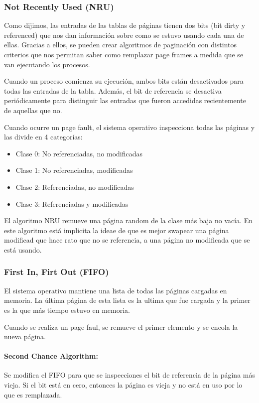 \subsubsection{Not Recently Used (NRU)}
Como dijimos, las entradas de las tablas de páginas tienen dos bits (bit dirty y referenced) que nos dan información sobre como se estuvo usando cada una de ellas. Gracias a ellos, se pueden crear algoritmos de paginación con distintos criterios que nos permitan saber como remplazar page frames a medida que se van ejecutando los procesos.

Cuando un proceso comienza su ejecución, ambos bits están desactivados para todas las entradas de la tabla. Además, el bit de referencia se desactiva periódicamente para distinguir las entradas que fueron accedidas recientemente de aquellas que no.

Cuando ocurre un page fault, el sistema operativo inspecciona todas las páginas y las divide en 4 categorías:

\begin{itemize}
	\item Clase 0: No referenciadas, no modificadas
	\item Clase 1: No referenciadas, modificadas
	\item Clase 2: Referenciadas, no modificadas
	\item Clase 3: Referenciadas y modificadas
\end{itemize}

El algoritmo NRU remueve una página random de la clase más baja no vacía. En este algoritmo está implicita la ideae de que es mejor swapear una página modificad que hace rato que no se referencia, a una página no modificada que se está usando.

\subsubsection{First In, Firt Out (FIFO)}
El sistema operativo mantiene una lista de todas las páginas cargadas en memoria. La última página de esta lista es la ultima que fue cargada y la primer es la que más tiempo estuvo en memoria.

Cuando se realiza un page faul, se remueve el primer elemento y se encola la nueva página.

\paragraph{Second Chance Algorithm:} Se modifica el FIFO para que se inspecciones el bit de referencia de la página más vieja. Si el bit está en cero, entonces la página es vieja y no está en uso por lo que es remplazada. 

